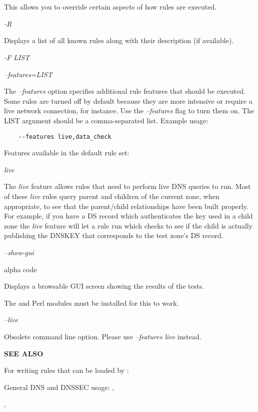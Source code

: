 \begin{description}
This allows you to override certain aspects of how rules are executed.

\item {\it -R}\verb" "

Displays a list of all known rules along with their description (if available).

\item {\it -F LIST}\verb" "

\item {\it --features=LIST}\verb" "

The {\it --features} option specifies additional rule features that should
be executed.  Some rules are turned off by default because they are
more intensive or require a live network connection, for instance.
Use the {\it --features} flag to turn them on.  The LIST argument should be
a comma-separated list.  Example usage:

\begin{verbatim}
    --features live,data_check
\end{verbatim}

Features available in the default rule set:

\begin{description}

\item {\it live}\verb" "

The {\it live} feature allows rules that need to perform live DNS queries
to run.  Most of these {\it live} rules query parent and children of the
current zone, when appropriate, to see that the parent/child
relationships have been built properly.  For example, if you have a
DS record which authenticates the key used in a child zone the {\it live}
feature will let a rule run which checks to see if the child is
actually publishing the DNSKEY that corresponds to the test zone's DS
record.

\end{description}

\item {\it --show-gui}\verb" "

alpha code

Displays a browsable GUI screen showing the results of the  tests.

The  and  Perl modules must be installed
for this to work.

\item {\it --live}\verb" "

Obsolete command line option.  Please use {\it --features live} instead.

\end{description}

{\bf SEE ALSO}

For writing rules that can be loaded by :

General DNS and DNSSEC usage: , 

, 
